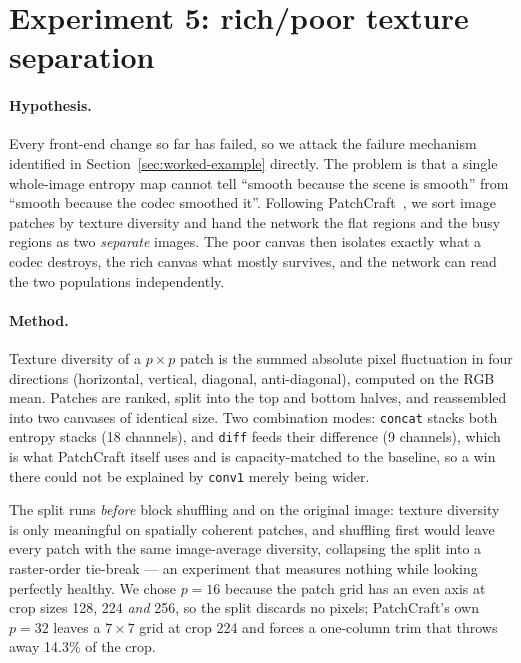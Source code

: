 \section{Experiment 5: rich/poor texture separation}
\label{sec:exp-texture}

\paragraph{Hypothesis.} Every front-end change so far has failed, so we
attack the failure mechanism identified in Section~\ref{sec:worked-example}
directly. The problem is that a single whole-image entropy map cannot tell
``smooth because the scene is smooth'' from ``smooth because the codec smoothed
it''. Following PatchCraft~\cite{zhong2024patchcraft}, we sort image patches by
texture diversity and hand the network the flat regions and the busy regions as
two \emph{separate} images. The poor canvas then isolates exactly what a codec
destroys, the rich canvas what mostly survives, and the network can read the two
populations independently.

\paragraph{Method.} Texture diversity of a $p\times p$ patch is the summed
absolute pixel fluctuation in four directions (horizontal, vertical, diagonal,
anti-diagonal), computed on the RGB mean. Patches are ranked, split into the top
and bottom halves, and reassembled into two canvases of identical size. Two
combination modes: \texttt{concat} stacks both entropy stacks (18 channels), and
\texttt{diff} feeds their difference (9 channels), which is what PatchCraft
itself uses and is capacity-matched to the baseline, so a win there could not be
explained by \texttt{conv1} merely being wider.

The split runs \emph{before} block shuffling and on the original image: texture
diversity is only meaningful on spatially coherent patches, and shuffling first
would leave every patch with the same image-average diversity, collapsing the
split into a raster-order tie-break --- an experiment that measures nothing while
looking perfectly healthy. We chose $p=16$ because the patch grid has an even
axis at crop sizes 128, 224 \emph{and} 256, so the split discards no pixels;
PatchCraft's own $p=32$ leaves a $7\times7$ grid at crop 224 and forces a
one-column trim that throws away 14.3\% of the crop.

